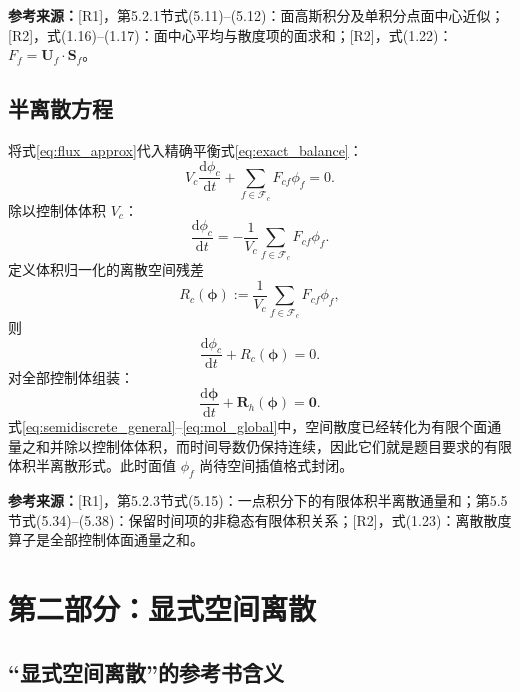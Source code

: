 \documentclass[UTF8,12pt,a4paper]{ctexart}
\numberwithin{equation}{section}
\newcommand{\Rone}{\textnormal{[R1]}}
\newcommand{\Rtwo}{\textnormal{[R2]}}
\newcommand{\source}[1]{%
  \par\smallskip
  \noindent\colorbox{sourcebg}{%
    \parbox{0.955\linewidth}{\footnotesize\color{sourcegray}\textbf{参考来源：}#1}%
  }
  \par\smallskip
}
\newcommand{\phiv}{\bm\phi}
\begin{document}
\source{\Rone，第5.2.1节式(5.11)--(5.12)：面高斯积分及单积分点面中心近似；\Rtwo，式(1.16)--(1.17)：面中心平均与散度项的面求和；\Rtwo，式(1.22)：$F_f=\bm U_f\cdot\bm S_f$。}

\subsection{半离散方程}

将式\eqref{eq:flux_approx}代入精确平衡式\eqref{eq:exact_balance}：
\begin{equation}
  V_c\frac{\mathrm d\phi_c}{\mathrm dt}
  +\sum_{f\in\mathcal F_c}F_{cf}\phi_f=0.
  \label{eq:semidiscrete_integral}
\end{equation}
除以控制体体积 $V_c$：
\begin{equation}
  \boxed{
  \frac{\mathrm d\phi_c}{\mathrm dt}
  =-\frac{1}{V_c}\sum_{f\in\mathcal F_c}F_{cf}\phi_f
  }.
  \label{eq:semidiscrete_general}
\end{equation}
定义体积归一化的离散空间残差
\begin{equation}
  R_c(\phiv)
  :=\frac{1}{V_c}\sum_{f\in\mathcal F_c}F_{cf}\phi_f,
  \label{eq:spatial_operator_general}
\end{equation}
则
\begin{equation}
  \boxed{
  \frac{\mathrm d\phi_c}{\mathrm dt}+R_c(\phiv)=0
  }.
  \label{eq:mol_cell}
\end{equation}
对全部控制体组装：
\begin{equation}
  \boxed{
  \frac{\mathrm d\phiv}{\mathrm dt}+\bm R_h(\phiv)=\bm0
  }.
  \label{eq:mol_global}
\end{equation}
式\eqref{eq:semidiscrete_general}--\eqref{eq:mol_global}中，空间散度已经转化为有限个面通量之和并除以控制体体积，而时间导数仍保持连续，因此它们就是题目要求的有限体积半离散形式。此时面值 $\phi_f$ 尚待空间插值格式封闭。

\source{\Rone，第5.2.3节式(5.15)：一点积分下的有限体积半离散通量和；第5.5节式(5.34)--(5.38)：保留时间项的非稳态有限体积关系；\Rtwo，式(1.23)：离散散度算子是全部控制体面通量之和。}

\newpage
\section{第二部分：显式空间离散}

\subsection{“显式空间离散”的参考书含义}
\end{document}
